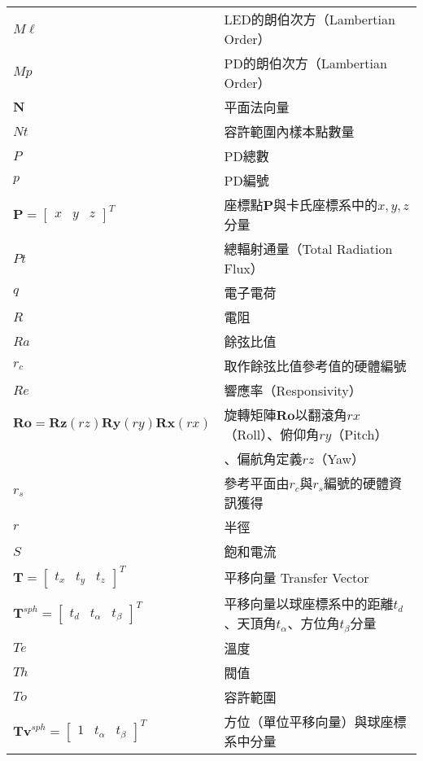 \begin{longtable}[l]{ll}
    $M\ell$ & LED的朗伯次方（Lambertian Order）\\
    $Mp$ & PD的朗伯次方（Lambertian Order）\\

    $\boldsymbol{N}$& 平面法向量\\
    $Nt$&容許範圍內樣本點數量\\

    $P$ & PD總數\\
    $p$ & PD編號\\
    $\boldsymbol{P} =
        \left[\begin{array}{ccc}
        x &y&z
       \end{array}\right]^T $ & 座標點$\boldsymbol{P}$與卡氏座標系中的$x,y,z$分量\\
    $Pt$ & 總輻射通量（Total Radiation Flux）\\ 

    $q$&電子電荷\\

    $R$&電阻\\
    $Ra$& 餘弦比值\\
    $r_c$& 取作餘弦比值參考值的硬體編號\\
    $Re$ & 響應率（Responsivity）\\
    $\boldsymbol{Ro}=\boldsymbol{Rz}(rz)\boldsymbol{Ry}(ry)\boldsymbol{Rx}(rx)$ & 
        旋轉矩陣$\boldsymbol{Ro}$以翻滾角$rx$（Roll）、俯仰角$ry$（Pitch）\\
        & 、偏航角定義$rz$（Yaw）\\%
    $r_s$& 參考平面由$r_c$與$r_s$編號的硬體資訊獲得\\

    $r$ & 半徑\\

    $S$ &飽和電流\\

    $\boldsymbol{T}=\left[\begin{array}{ccc}t_x&t_y&t_z\end{array}\right]^T$ & 平移向量 Transfer Vector\\
    $\boldsymbol{T}^{sph}=\left[\begin{array}{ccc}t_d&t_{\alpha}&t_{\beta}\end{array}\right]^T$ & 平移向量以球座標系中的距離$t_d$、天頂角$t_{\alpha}$、方位角$t_{\beta}$分量\\
    $Te$& 溫度\\
    $Th$& 閥值\\
    $To$&容許範圍\\
    $\boldsymbol{Tv}^{sph}=\left[\begin{array}{ccc}1&t_{\alpha}&t_{\beta}\end{array}\right]^T$ & 方位（單位平移向量）與球座標系中分量\\



\end{longtable}

